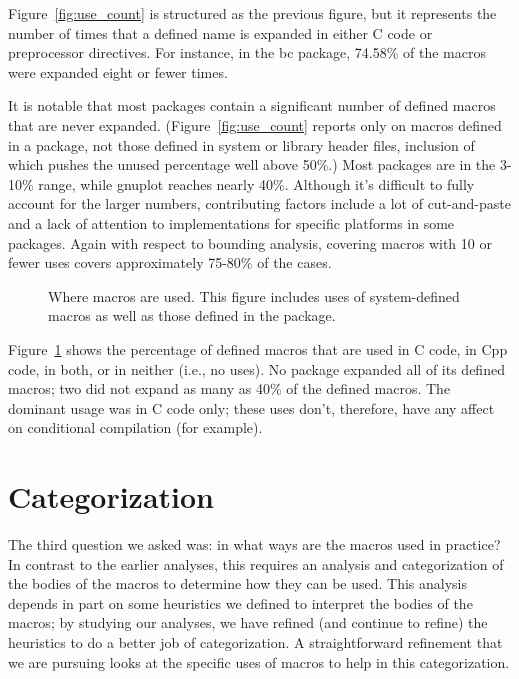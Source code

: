 \documentclass[11pt]{article}
\begin{document}
Figure~\ref{fig:use_count} is structured as the previous figure, but it
represents the number of times that a defined name is expanded in
either C code or preprocessor directives.  For instance, in the bc
package, 74.58\% of the macros were expanded eight or fewer times.

It is notable that most packages contain a significant number of defined
macros that are never expanded.  (Figure~\ref{fig:use_count} reports only
on macros defined in a package, not those defined in system or library
header files, inclusion of which pushes the unused percentage well above 50\%.)
Most packages are in the 3-10\% range, while gnuplot
reaches nearly 40\%.  Although it's difficult to fully account for the
larger numbers, contributing factors include a lot of cut-and-paste
and a lack of attention to implementations for specific platforms in
some packages.  Again with respect to bounding analysis, covering
macros with 10 or fewer uses covers approximately 75-80\% of the cases.

\begin{figure}
\centerline{}
\caption{Where macros are used.  This figure includes uses of
  system-defined macros as well as those defined in the package.}
\label{fig:define_usage}
\end{figure}

Figure~\ref{fig:define_usage} shows the percentage of defined macros
that are used in C code, in Cpp code, in both, or in neither (i.e., no
uses).  No package expanded all of its defined macros; two did not
expand as many as 40\% of the defined macros.  The dominant usage was
in C code only; these uses don't, therefore, have any affect on
conditional compilation (for example).  


\section{Categorization}
\label{sec:categorization}

The third question we asked was: in what ways are the macros used in
practice?  In contrast to the earlier analyses, this requires an
analysis and categorization of the bodies of the macros to determine
how they can be used.  This analysis depends in part on some
heuristics we defined to interpret the bodies of the macros; by
studying our analyses, we have refined (and continue to refine) the
heuristics to do a better job of categorization.  A straightforward
refinement that we are pursuing looks at the specific uses of macros
to help in this categorization.
\end{document}
